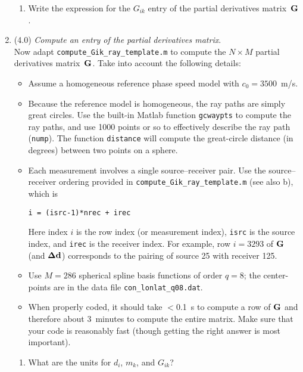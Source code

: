 \documentclass[11pt,titlepage,fleqn]{article}
\begin{document}
\begin{enumerate}
\begin{enumerate}
\item Write the expression for the $G_{ik}$ entry of the partial derivatives matrix~$\mbox{${\bf G}$}$.
\end{enumerate}


\item (4.0) {\em Compute an entry of the partial derivatives matrix}. \\
Now adapt \verb+compute_Gik_ray_template.m+ to compute the $N \times M$ partial derivatives matrix~$\mbox{${\bf G}$}$.
Take into account the following details:
%
\begin{itemize}
\item Assume a homogeneous reference phase speed model with $c_0 = 3500$~m/s.

\item Because the reference model is homogeneous, the ray paths are simply great circles.  Use the built-in Matlab function \verb+gcwaypts+ to compute the ray paths, and use 1000 points or so to effectively describe the ray path (\verb+nump+). The function \verb+distance+ will compute the great-circle distance (in degrees) between two points on a sphere.

\item Each measurement involves a single source--receiver pair. Use the source--receiver ordering provided in \verb+compute_Gik_ray_template.m+ (see also b), which is
%
\begin{verbatim}
i = (isrc-1)*nrec + irec
\end{verbatim}
%
Here index $i$ is the row index (or measurement index), \verb+isrc+ is the source index, and \verb+irec+ is the receiver index.
For example, row $i=3293$ of $\mbox{${\bf G}$}$ (and $\mbox{\boldmath $\bf \Delta$}\mbox{${\bf d}$}$) corresponds to the pairing of source 25 with receiver 125.

\item Use $M=286$ spherical spline basis functions of order $q=8$; the center-points are in the data file \verb+con_lonlat_q08.dat+.

\item When properly coded, it should take $<$0.1~s to compute a row of $\mbox{${\bf G}$}$ and therefore about 3~minutes to compute the entire matrix. Make sure that your code is reasonably fast (though getting the right answer is most important).

\end{itemize}

\begin{enumerate}
\item What are the units for $d_i$, $m_k$, and $G_{ik}$?


\end{enumerate}
\end{enumerate}
\end{document}
